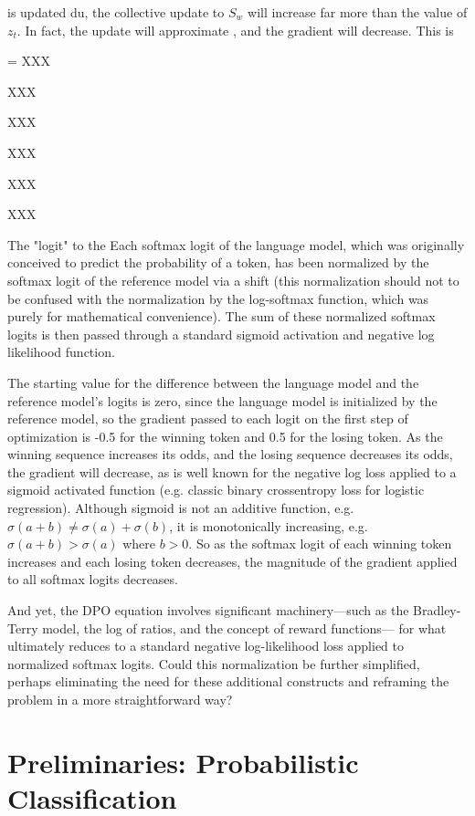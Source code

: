 \documentclass[twoside,11pt]{article}
\begin{document}
is updated du, the collective update to
$S_w$ will increase far more than the value of $z_t$. In fact,
the update will approximate , and the gradient will decrease. This is 

=
XXX

XXX

XXX

XXX

XXX

XXX


The "logit" to the 
Each softmax logit of the language model, which was originally conceived to predict the probability of a token,
has been normalized by the softmax logit of the reference model via a shift (this normalization
should not to be confused with the normalization
by the log-softmax function, which was purely for mathematical convenience). The 
sum of these normalized softmax logits is then passed through a standard sigmoid activation and 
negative log likelihood function.

The starting value for the difference between the language model 
and the reference model's logits is zero, since the language model is initialized
by the reference model, so the gradient passed to each logit on the first step of 
optimization is -0.5 for the winning token and 0.5 for the losing token. As the 
winning sequence increases its odds, and the losing sequence decreases its odds,
the gradient will decrease, as is well known for the negative log loss applied
to a sigmoid activated function (e.g. classic binary crossentropy loss for
logistic regression). Although sigmoid is not an additive function, 
e.g. $\sigma(a + b) \neq \sigma(a) + \sigma(b)$, it is monotonically increasing,
e.g. $\sigma(a + b) > \sigma(a)$ where $b > 0$. So as the softmax logit of
each winning token increases and each losing token decreases, the magnitude of the
gradient applied to all softmax logits decreases.

And yet, the DPO equation involves significant 
machinery—such as the Bradley-Terry model, 
the log of ratios, and the concept of 
reward functions—
for what ultimately reduces to a standard 
negative log-likelihood loss applied to 
normalized softmax logits. Could this normalization 
be further simplified, perhaps eliminating 
the need for these additional constructs and 
reframing the problem in a more straightforward way?

\section{Preliminaries: Probabilistic Classification}
\end{document}
